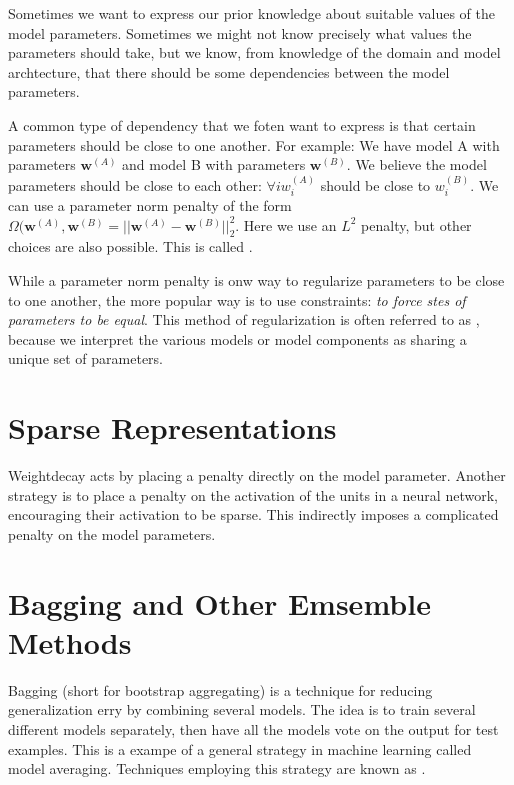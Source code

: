 Sometimes we want to express our prior knowledge about suitable values of the model parameters.
Sometimes we might not know precisely what values the parameters should take, but we know, from knowledge of the domain and model archtecture, that there should be some dependencies between the model parameters.

A common type of dependency that we foten want to express is that certain parameters should be close to one another.
For example:
We have model A with parameters $\bm{w}^{(A)}$ and model B with parameters $\bm{w}^{(B)}$.
We believe the model parameters should be close to each other: $\forall i w_i^{(A)}$ should be close to $w_i^{(B)}$.
We can use a parameter norm penalty of the form $\Omega(\bm{w}^{(A)},\bm{w}^{(B)} = || \bm{w}^{(A)} - \bm{w}^{(B)} ||_2^2$.
Here we use an $L^2$ penalty, but other choices are also possible.
This is called .


While a parameter norm penalty is onw way to regularize parameters to be close to one another, the more popular way is to use constraints:
\textit{to force stes of parameters to be equal}.
This method of regularization is often referred to as , because we interpret the various models or model components as sharing a unique set of parameters.


\section{Sparse Representations}


Weightdecay acts by placing a penalty directly on the model parameter.
Another strategy is to place a penalty on the activation of the units in a neural network, encouraging their activation to be sparse.
This indirectly imposes a complicated penalty on the model parameters.


\section{Bagging and Other Emsemble Methods}

Bagging (short for bootstrap aggregating) is a technique for reducing generalization erry by combining several models.
The idea is to  train several different models separately, then have all the models vote on the output for test examples.
This is a exampe of a general strategy in machine learning called model averaging.
Techniques employing this strategy are known as .


